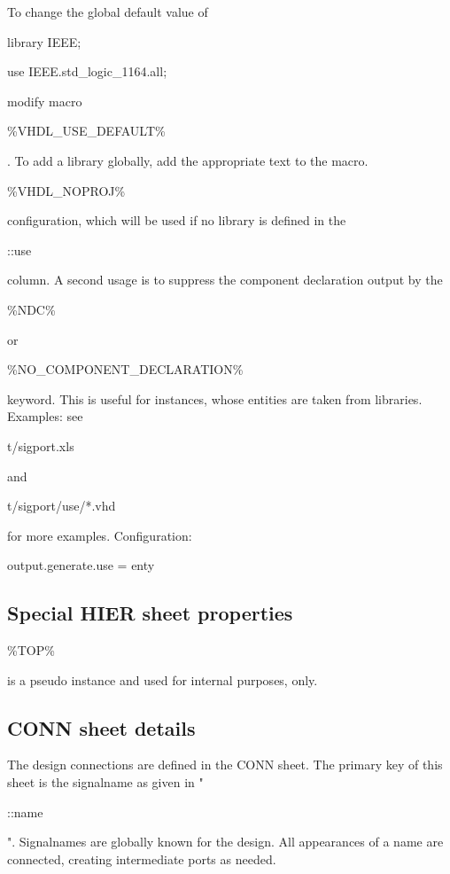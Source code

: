 \documentclass[a4paper,12pt]{article}
\begin{document}
To change the global default value of\newline
\hspace*{20mm}\begin{tt}library IEEE;\end{tt}\newline
\hspace*{20mm}\begin{tt}use IEEE.std\_logic\_1164.all;\end{tt}\newline
modify macro \begin{tt}\%VHDL\_USE\_DEFAULT\%\end{tt}.\newline
To add a library globally, add the appropriate text to the macro.\begin{tt}\%VHDL\_NOPROJ\%\end{tt} configuration, which will be used if no library is defined in the \begin{tt}::use\end{tt} column.\newline
A second usage is to suppress the component declaration output by the \begin{tt}\%NDC\%\end{tt} or \newline\begin{tt}\%NO\_COMPONENT\_DECLARATION\%\end{tt} keyword. This is useful for instances, whose entities are taken from libraries.\newline
\newline
Examples: see \begin{tt}t/sigport.xls\end{tt} and \begin{tt}t/sigport/use/*.vhd\end{tt} for more examples.\newline
Configuration: \begin{tt}output.generate.use = enty\end{tt}

\subsection{Special HIER sheet properties}
\begin{tt}\%TOP\%\end{tt} is a pseudo instance and used for internal purposes, only.

\subsection{CONN sheet details}
The design connections are defined in the CONN sheet. The primary key of this sheet is the signalname as given in "\begin{tt}::name\end{tt}". Signalnames are globally known for the design. All appearances of a name are connected, creating intermediate ports as needed.
\end{document}
